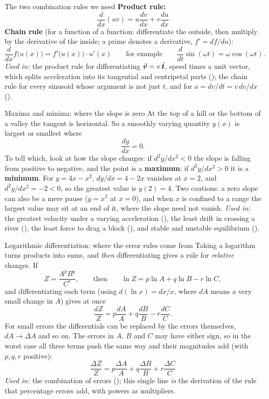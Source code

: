 \begin{methodbox}{The two combination rules we need}
\textbf{Product rule:}
\[
\frac{d}{dx}(uv)=u\frac{dv}{dx}+v\frac{du}{dx}
\]
\textbf{Chain rule} (for a function of a function: differentiate the outside, then multiply by the
derivative of the inside; a prime denotes a derivative, $f'=df/du$):
\[
\frac{d}{dx}f\big(u(x)\big)=f'\big(u(x)\big)\cdot u'(x)
\qquad\text{for example}\qquad
\frac{d}{dt}\sin(\omega t)=\omega\cos(\omega t).
\]
\emph{Used in:} the product rule for differentiating $\vec{\bm{v}}=v\,\hat{\bm{t}}$, speed times a unit vector, which
splits acceleration into its tangential and centripetal parts (); the chain rule for
every sinusoid whose argument is not just $t$, and for $a=dv/dt=v\,dv/dx$ ().
\end{methodbox}

\begin{defbox}{Maxima and minima: where the slope is zero}
At the top of a hill or the bottom of a valley the tangent is horizontal. So a smoothly varying
quantity $y(x)$ is largest or smallest where
\[
\frac{dy}{dx}=0.
\]
To tell which, look at how the slope changes: if $d^{2}y/dx^{2}<0$ the slope is falling from positive to
negative, and the point is a \textbf{maximum}; if $d^{2}y/dx^{2}>0$ it is a \textbf{minimum}. For
$y=4x-x^{2}$, $dy/dx=4-2x$ vanishes at $x=2$, and $d^{2}y/dx^{2}=-2<0$, so the greatest value is
$y(2)=4$. Two cautions: a zero slope can also be a mere pause ($y=x^{3}$ at $x=0$), and when $x$ is
confined to a range the largest value may sit at an end of it, where the slope need not vanish.
\emph{Used in:} the greatest velocity under a varying acceleration (), the least
drift in crossing a river (), the least force to drag a block (),
and stable and unstable equilibrium ().
\end{defbox}

\begin{methodbox}{Logarithmic differentiation: where the error rules come from}
Taking a logarithm turns products into sums, and \emph{then} differentiating gives a rule for
\emph{relative} changes. If
\[
Z=\frac{A^{p}B^{q}}{C^{r}},\qquad\text{then}\qquad \ln Z=p\ln A+q\ln B-r\ln C,
\]
and differentiating each term (using $d(\ln x)=dx/x$, where $dA$ means a very small change in $A$)
gives at once
\[
\frac{dZ}{Z}=p\frac{dA}{A}+q\frac{dB}{B}-r\frac{dC}{C}.
\]
For small errors the differentials can be replaced by the errors themselves, $dA\to\Delta A$ and so on.
The errors in $A$, $B$ and $C$ may have either sign, so in the worst case all three terms push the same
way and their magnitudes add (with $p,q,r$ positive):
\[
\boxed{\;\frac{\Delta Z}{Z}=p\frac{\Delta A}{A}+q\frac{\Delta B}{B}+r\frac{\Delta C}{C}\;}
\]
\emph{Used in:} the combination of errors (); this single line \emph{is} the derivation of the
rule that percentage errors add, with powers as multipliers.
\end{methodbox}

